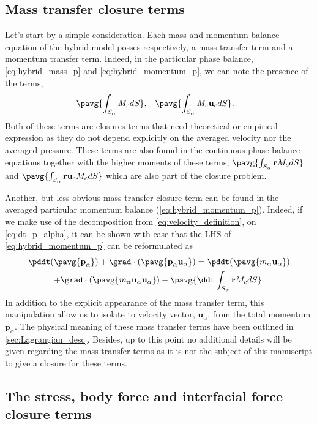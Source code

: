 \subsection{Mass transfer closure terms}

Let's start by a simple consideration. 
Each mass and momentum balance equation of the hybrid model posses respectively, a mass transfer term and a momentum transfer term. 
Indeed, in the particular phase balance, \ref{eq:hybrid_mass_p} and \ref{eq:hybrid_momentum_p}, we can note the presence of the terms,
\begin{equation*}
    \pavg{\int_{S_\alpha} M_c dS},  \;\;\;
    \pavg{\int_{S_\alpha} M_c \textbf{u}_c dS}.  \;\;\;
\end{equation*}
Both of these terms are closures terms that need theoretical or empirical expression as they do not depend explicitly on the averaged velocity nor the averaged pressure. 
These terms are also found in the continuous phase balance equations together with the higher moments of these terms, $\pavg{\int_{S_\alpha} \textbf{r} M_c dS}$ and $\pavg{\int_{S_\alpha} \textbf{r}  \textbf{u}_c M_c dS}$ which are also part of the closure problem. 

Another, but less obvious mass transfer closure term can be found in the averaged particular momentum balance (\ref{eq:hybrid_momentum_p}). 
Indeed, if we make use of the decomposition from \ref{eq:velocity_definition}, on \ref{eq:dt_p_alpha},  it  can be shown with ease that the LHS of \ref{eq:hybrid_momentum_p} can be reformulated as  
\begin{multline}
    \pddt   (\pavg{\textbf{p}_\alpha})
    + \grad \cdot (\pavg{\textbf{p}_\alpha \textbf{u}_\alpha}) 
    = \pddt (\pavg{m_\alpha\textbf{u}_\alpha}) \\
    + \grad \cdot (\pavg{m_\alpha \textbf{u}_\alpha \textbf{u}_\alpha})
    - \pavg{\ddt \int_{S_\alpha} \textbf{r} M_c dS}.
    \label{eq:advection_term_eq}
\end{multline}
In addition to the explicit appearance of the mass transfer term, this manipulation allow us to isolate to velocity vector, $\textbf{u}_\alpha$, from the total momentum $\textbf{p}_\alpha$. 
The physical meaning of these mass transfer terms have been outlined in \ref{sec:Lagrangian_desc}.
Besides, up to this point no additional details will be  given regarding the mass transfer terms as it is not the subject  of this manuscript to give a closure for these terms. 

\subsection{The stress, body force and interfacial force closure terms}

